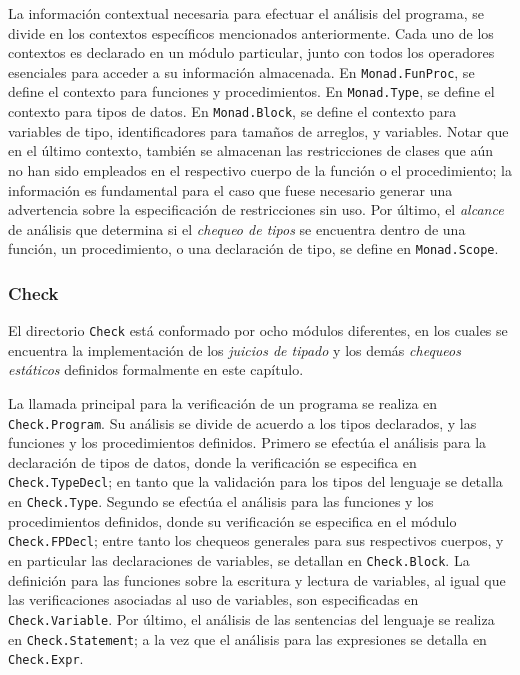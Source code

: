 La información contextual necesaria para efectuar el análisis del programa, se divide en los contextos específicos mencionados anteriormente.
Cada uno de los contextos es declarado en un módulo particular, junto con todos los operadores esenciales para acceder a su información almacenada.
En \lstinline[style = module]{Monad.FunProc}, se define el contexto para funciones y procedimientos.
En \lstinline[style = module]{Monad.Type}, se define el contexto para tipos de datos.
En \lstinline[style = module]{Monad.Block}, se define el contexto para variables de tipo, identificadores para tamaños de arreglos, y variables.
Notar que en el último contexto, también se almacenan las restricciones de clases que aún no han sido empleados en el respectivo cuerpo de la función o el procedimiento; la información es fundamental para el caso que fuese necesario generar una advertencia sobre la especificación de restricciones sin uso.
Por último, el \textit{alcance} de análisis que determina si el \textit{chequeo de tipos} se encuentra dentro de una función, un procedimiento, o una declaración de tipo, se define en \lstinline[style = module]{Monad.Scope}.

\subsubsection{Check}

El directorio \lstinline[style = module]{Check} está conformado por ocho módulos diferentes, en los cuales se encuentra la implementación de los \textit{juicios de tipado} y los demás \textit{chequeos estáticos} definidos formalmente en este capítulo.

La llamada principal para la verificación de un programa se realiza en \lstinline[style = module]{Check.Program}.
Su análisis se divide de acuerdo a los tipos declarados, y las funciones y los procedimientos definidos.
Primero se efectúa el análisis para la declaración de tipos de datos, donde la verificación se especifica en \lstinline[style = module]{Check.TypeDecl}; en tanto que la validación para los tipos del lenguaje se detalla en \lstinline[style = module]{Check.Type}.
Segundo se efectúa el análisis para las funciones y los procedimientos definidos, donde su verificación se especifica en el módulo \lstinline[style = module]{Check.FPDecl}; entre tanto los chequeos generales para sus respectivos cuerpos, y en particular las declaraciones de variables, se detallan en \lstinline[style = module]{Check.Block}.
La definición para las funciones sobre la escritura y lectura de variables, al igual que las verificaciones asociadas al uso de variables, son especificadas en \lstinline[style = module]{Check.Variable}.
Por último, el análisis de las sentencias del lenguaje se realiza en \lstinline[style = module]{Check.Statement}; a la vez que el análisis para las expresiones se detalla en \lstinline[style = module]{Check.Expr}.


